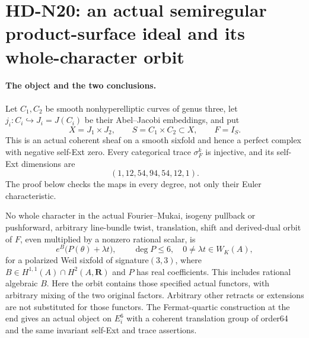 \section{HD-N20: an actual semiregular product-surface ideal and its whole-character orbit}
\label{sec:product-surface-ideal}

\paragraph{The object and the two conclusions.}
Let $C_1,C_2$ be smooth nonhyperelliptic curves of genus three,
let $j_i:C_i\hookrightarrow J_i=J(C_i)$ be their Abel--Jacobi
embeddings, and put
\[
 X=J_1\times J_2,\qquad S=C_1\times C_2\subset X,\qquad F=I_S.
                                                               \tag{N20.1}
\]
This is an actual coherent sheaf on a smooth sixfold and hence a
perfect complex with negative self-Ext zero. Every categorical trace
$\sigma_F^k$ is injective, and its self-Ext dimensions are
\[
                   (1,12,54,94,54,12,1).                       \tag{N20.2}
\]
The proof below checks the maps in every degree, not only their
Euler characteristic.

No whole character in the actual Fourier--Mukai, isogeny pullback or
pushforward, arbitrary line-bundle twist, translation, shift and
derived-dual orbit of $F$, even multiplied by a nonzero rational
scalar, is
\[
 e^B\bigl(P(\theta)+\lambda t\bigr),\qquad
 \deg P\le6,\quad 0\ne\lambda t\in W_K(A),                       \tag{N20.3}
\]
for a polarized Weil sixfold of signature$(3,3)$, where
$B\in H^{1,1}(A)\cap H^2(A,\mathbf R)$ and $P$ has real
coefficients. This includes rational algebraic $B$.
Here the orbit contains those specified actual functors, with
arbitrary mixing of the two original factors. Arbitrary other
retracts or extensions are not substituted for those functors.
The Fermat-quartic construction at the end gives an actual object
on $E_i^6$ with a coherent translation group of order64 and the
same invariant self-Ext and trace assertions.

